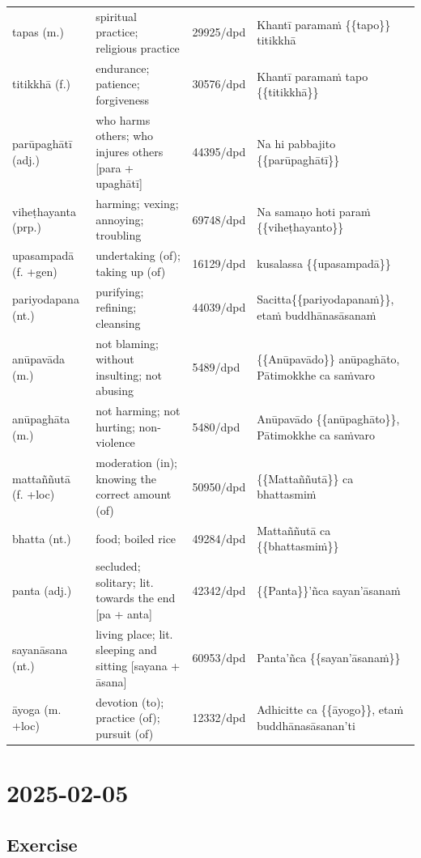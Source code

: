 \documentclass[11pt,oneside]{memoir}
\begin{document}
\begin{longtable}{L{\colOne} L{\colTwo} H H}
tapas (m.) & spiritual practice; religious practice & 29925/dpd & Khantī paramaṁ \{\{tapo\}\} titikkhā\\[0pt]
titikkhā (f.) & endurance; patience; forgiveness & 30576/dpd & Khantī paramaṁ tapo \{\{titikkhā\}\}\\[0pt]
parūpaghātī (adj.) & who harms others; who injures others [para + upaghātī] & 44395/dpd & Na hi pabbajito \{\{parūpaghātī\}\}\\[0pt]
viheṭhayanta (prp.) & harming; vexing; annoying; troubling & 69748/dpd & Na samaṇo hoti paraṁ \{\{viheṭhayanto\}\}\\[0pt]
upasampadā (f. +gen) & undertaking (of); taking up (of) & 16129/dpd & kusalassa \{\{upasampadā\}\}\\[0pt]
pariyodapana (nt.) & purifying; refining; cleansing & 44039/dpd & Sacitta\{\{pariyodapanaṁ\}\}, etaṁ buddhānasāsanaṁ\\[0pt]
anūpavāda (m.) & not blaming; without insulting; not abusing & 5489/dpd & \{\{Anūpavādo\}\} anūpaghāto, Pātimokkhe ca saṁvaro\\[0pt]
anūpaghāta (m.) & not harming; not hurting; non-violence & 5480/dpd & Anūpavādo \{\{anūpaghāto\}\}, Pātimokkhe ca saṁvaro\\[0pt]
mattaññutā (f. +loc) & moderation (in); knowing the correct amount (of) & 50950/dpd & \{\{Mattaññutā\}\} ca bhattasmiṁ\\[0pt]
bhatta (nt.) & food; boiled rice & 49284/dpd & Mattaññutā ca \{\{bhattasmiṁ\}\}\\[0pt]
panta (adj.) & secluded; solitary; lit. towards the end [pa + anta] & 42342/dpd & \{\{Panta\}\}'ñca sayan'āsanaṁ\\[0pt]
sayanāsana (nt.) & living place; lit. sleeping and sitting [sayana + āsana] & 60953/dpd & Panta'ñca \{\{sayan'āsanaṁ\}\}\\[0pt]
āyoga (m. +loc) & devotion (to); practice (of); pursuit (of) & 12332/dpd & Adhicitte ca \{\{āyogo\}\}, etaṁ buddhānasāsanan'ti\\[0pt]
\end{longtable}

\chapter{2025-02-05}
\label{sec:orgb9aa29f}
\section{Exercise}
\label{sec:org2f65bb2}
\end{document}
